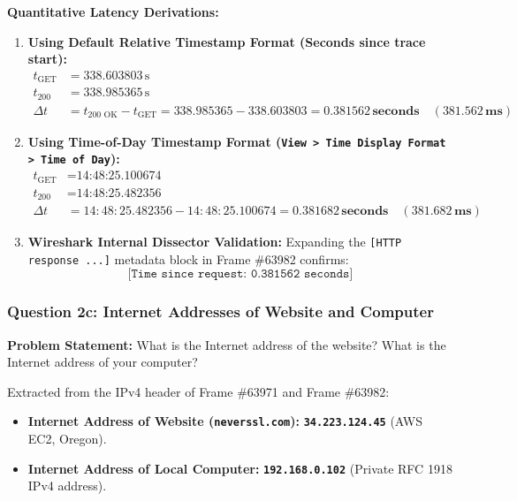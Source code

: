 \documentclass[11pt,a4paper]{article}
\begin{document}
\textbf{Quantitative Latency Derivations:}
\begin{enumerate}[leftmargin=*]
    \item \textbf{Using Default Relative Timestamp Format (Seconds since trace start):}
    \begin{align*}
        t_{\text{GET}} &= 338.603803\,\text{s} \\
        t_{\text{200 OK}} &= 338.985365\,\text{s} \\
        \Delta t &= t_{\text{200 OK}} - t_{\text{GET}} = 338.985365 - 338.603803 = \mathbf{0.381562\,\text{seconds}} \quad (\mathbf{381.562\,\text{ms}})
    \end{align*}
    
    \item \textbf{Using Time-of-Day Timestamp Format (\texttt{View > Time Display Format > Time of Day}):}
    \begin{align*}
        t_{\text{GET}} &= \text{14:48:25.100674} \\
        t_{\text{200 OK}} &= \text{14:48:25.482356} \\
        \Delta t &= 14:48:25.482356 - 14:48:25.100674 = \mathbf{0.381682\,\text{seconds}} \quad (\mathbf{381.682\,\text{ms}})
    \end{align*}
    
    \item \textbf{Wireshark Internal Dissector Validation:}
    Expanding the \texttt{[HTTP response ...]} metadata block in Frame \#63982 confirms:
    $$\texttt{[Time since request: 0.381562 seconds]}$$
\end{enumerate}

\subsubsection{Question 2c: Internet Addresses of Website and Computer}
\textbf{Problem Statement:} What is the Internet address of the website? What is the Internet address of your computer?

Extracted from the IPv4 header of Frame \#63971 and Frame \#63982:
\begin{itemize}[leftmargin=*]
    \item \textbf{Internet Address of Website (\texttt{neverssl.com}):} \texttt{\textbf{34.223.124.45}} (AWS EC2, Oregon).
    \item \textbf{Internet Address of Local Computer:} \texttt{\textbf{192.168.0.102}} (Private RFC 1918 IPv4 address).
\end{itemize}
\end{document}
